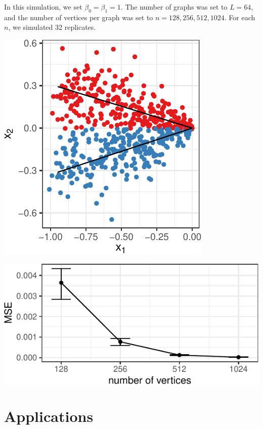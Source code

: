 \documentclass[12pt]{article}
\begin{document}
In this simulation, we set \(\beta_0 = \beta_1 = 1\). The number of
graphs was set to \(L = 64\), and the number of vertices per graph was
set to \(n = 128, 256, 512, 1024\). For each \(n\), we simulated 32
replicates.

\begin{center}\includegraphics{draft_files/figure-latex/angle-reg-example-1} \end{center}

\begin{center}\includegraphics{draft_files/figure-latex/angle-reg-results-1} \end{center}

\hypertarget{applications}{%
\section{Applications}\label{applications}}
\end{document}

